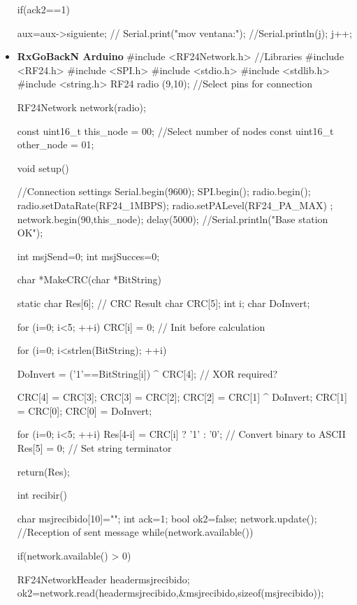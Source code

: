\documentclass[journal,trans]{IEEEtran}
\begin{document}
\begin{itemize}
{{{{              if(ack2==1){
        
                aux=aux->siguiente;
              // Serial.print("mov ventana:");
              //Serial.println(j);
              j++;
  
                        }   
              }
        }    
    }
  
}
\item \textbf{RxGoBackN Arduino}
#include <RF24Network.h>        //Libraries
#include <RF24.h>
#include <SPI.h>
#include <stdio.h>
#include <stdlib.h>
#include <string.h>
RF24 radio (9,10);              //Select pins for connection

RF24Network network(radio);

const uint16_t this_node = 00;         //Select number of nodes
const uint16_t other_node = 01;

void setup() {                        //Connection settings
  Serial.begin(9600);
   SPI.begin();
  radio.begin();
radio.setDataRate(RF24_1MBPS);
radio.setPALevel(RF24_PA_MAX) ;
  network.begin(90,this_node);
  delay(5000);
  //Serial.println("Base station OK");

}

int msjSend=0;
int msjSucces=0;


char *MakeCRC(char *BitString)
   {
   static char Res[6];                                 // CRC Result
   char CRC[5];
   int  i;
   char DoInvert;
   
   for (i=0; i<5; ++i)  CRC[i] = 0;                    // Init before calculation
   
   for (i=0; i<strlen(BitString); ++i)
      {
      DoInvert = ('1'==BitString[i]) ^ CRC[4];         // XOR required?

      CRC[4] = CRC[3];
      CRC[3] = CRC[2];
      CRC[2] = CRC[1] ^ DoInvert;
      CRC[1] = CRC[0];
      CRC[0] = DoInvert;
      }
      
   for (i=0; i<5; ++i)  Res[4-i] = CRC[i] ? '1' : '0'; // Convert binary to ASCII
   Res[5] = 0;                                         // Set string terminator

   return(Res);
   }


int recibir(){
 char msjrecibido[10]="";
  int ack=1;
    bool ok2=false;
   network.update();                 //Reception of sent message
    while(network.available()){
      if(network.available() > 0){
    RF24NetworkHeader headermsjrecibido;
    ok2=network.read(headermsjrecibido,&msjrecibido,sizeof(msjrecibido));

    }
  }
   
}
\end{itemize}
\end{document}
